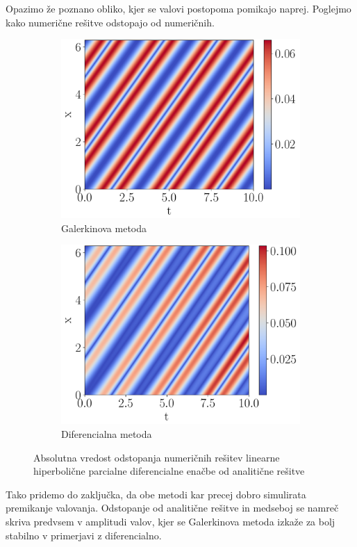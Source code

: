 \documentclass{article}
\begin{document}
Opazimo že poznano obliko, kjer se valovi postopoma pomikajo naprej. Poglejmo kako numerične rešitve odstopajo od numeričnih.
\begin{figure}[H]
    \centering
    \begin{subfigure}[b]{0.49\textwidth}
        \centering
        \includegraphics[width=\linewidth]{wavegalerkin2d.pdf}
		\caption{Galerkinova metoda}
    \end{subfigure}
    \hfill
    \begin{subfigure}[b]{0.49\textwidth}
        \centering
        \includegraphics[width=\linewidth]{wavediff2d.pdf}
		\caption{Diferencialna metoda}
    \end{subfigure}
	\caption{Absolutna vredost odstopanja numeričnih rešitev linearne hiperbolične parcialne diferencialne enačbe od analitične rešitve}
\end{figure}
Tako pridemo do zaključka, da obe metodi kar precej dobro simulirata premikanje valovanja. Odstopanje od analitične rešitve in medseboj se namreč skriva predvsem v amplitudi valov, kjer se Galerkinova metoda izkaže za bolj stabilno v primerjavi z diferencialno.
\end{document}
